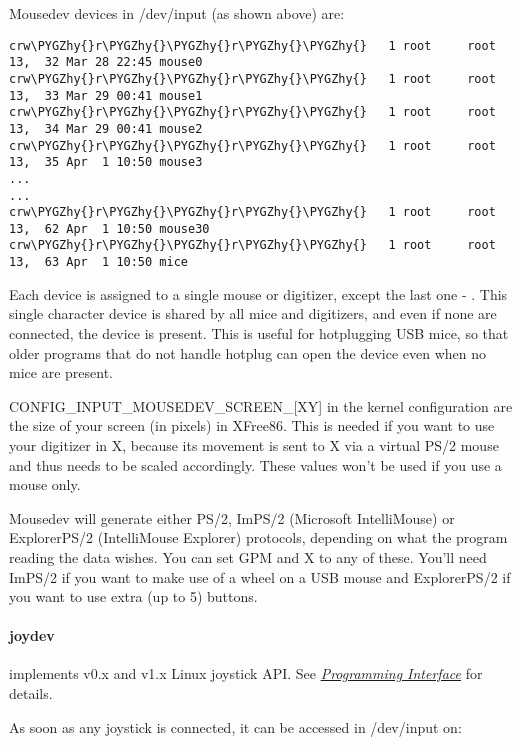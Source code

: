\documentclass[a4paper,8pt,english]{sphinxmanual}
\def\PYGZhy{\char`\-}
\begin{document}
Mousedev devices in /dev/input (as shown above) are:

\begin{Verbatim}[commandchars=\\\{\}]
crw\PYGZhy{}r\PYGZhy{}\PYGZhy{}r\PYGZhy{}\PYGZhy{}   1 root     root      13,  32 Mar 28 22:45 mouse0
crw\PYGZhy{}r\PYGZhy{}\PYGZhy{}r\PYGZhy{}\PYGZhy{}   1 root     root      13,  33 Mar 29 00:41 mouse1
crw\PYGZhy{}r\PYGZhy{}\PYGZhy{}r\PYGZhy{}\PYGZhy{}   1 root     root      13,  34 Mar 29 00:41 mouse2
crw\PYGZhy{}r\PYGZhy{}\PYGZhy{}r\PYGZhy{}\PYGZhy{}   1 root     root      13,  35 Apr  1 10:50 mouse3
...
...
crw\PYGZhy{}r\PYGZhy{}\PYGZhy{}r\PYGZhy{}\PYGZhy{}   1 root     root      13,  62 Apr  1 10:50 mouse30
crw\PYGZhy{}r\PYGZhy{}\PYGZhy{}r\PYGZhy{}\PYGZhy{}   1 root     root      13,  63 Apr  1 10:50 mice
\end{Verbatim}

Each  device is assigned to a single mouse or digitizer, except
the last one - . This single character device is shared by all
mice and digitizers, and even if none are connected, the device is
present.  This is useful for hotplugging USB mice, so that older programs
that do not handle hotplug can open the device even when no mice are
present.

CONFIG\_INPUT\_MOUSEDEV\_SCREEN\_{[}XY{]} in the kernel configuration are
the size of your screen (in pixels) in XFree86. This is needed if you
want to use your digitizer in X, because its movement is sent to X
via a virtual PS/2 mouse and thus needs to be scaled
accordingly. These values won't be used if you use a mouse only.

Mousedev will generate either PS/2, ImPS/2 (Microsoft IntelliMouse) or
ExplorerPS/2 (IntelliMouse Explorer) protocols, depending on what the
program reading the data wishes. You can set GPM and X to any of
these. You'll need ImPS/2 if you want to make use of a wheel on a USB
mouse and ExplorerPS/2 if you want to use extra (up to 5) buttons.


\paragraph{joydev}
\label{input/input:joydev}
 implements v0.x and v1.x Linux joystick API. See
{\hyperref[input/joydev/joystick\string-api:joystick\string-api]{\emph{Programming Interface}}} for details.

As soon as any joystick is connected, it can be accessed in /dev/input on:
\end{document}

